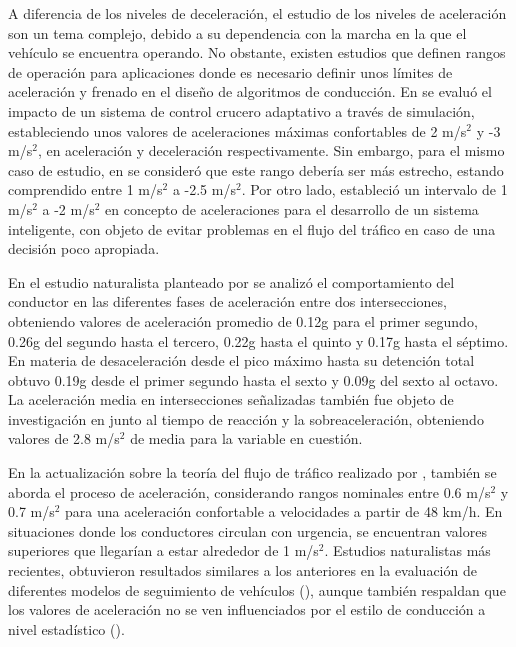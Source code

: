 A diferencia de los niveles de deceleración, el estudio de los niveles de aceleración son un tema complejo, debido a su dependencia con la marcha en la que el vehículo se encuentra operando. No obstante, existen estudios que definen rangos de operación para aplicaciones donde es necesario definir unos límites de aceleración y frenado en el diseño de algoritmos de conducción. En \textcite{vanarem} se evaluó el impacto de un sistema de control crucero adaptativo a través de simulación, estableciendo unos valores de aceleraciones máximas confortables de 2 m/s$^2$ y -3 m/s$^2$, en aceleración y deceleración respectivamente. Sin embargo, para el mismo caso de estudio, en \textcite{yi} se consideró que este rango debería ser más estrecho, estando comprendido entre 1 m/s$^2$ a -2.5 m/s$^2$. Por otro lado, \textcite{prestl} estableció un intervalo de 1 m/s$^2$ a -2 m/s$^2$ en concepto de aceleraciones para el desarrollo de un sistema inteligente, con objeto de evitar problemas en el flujo del tráfico en caso de una decisión poco apropiada. 

En el estudio naturalista planteado por \textcite{danaher} se analizó el comportamiento del conductor en las diferentes fases de aceleración entre dos intersecciones, obteniendo valores de aceleración promedio de 0.12g para el primer segundo, 0.26g del segundo hasta el tercero, 0.22g hasta el quinto y 0.17g hasta el séptimo. En materia de desaceleración desde el pico máximo hasta su detención total obtuvo 0.19g desde el primer segundo hasta el sexto y 0.09g del sexto al octavo. La aceleración media en intersecciones señalizadas también fue objeto de investigación en \textcite{almallah} junto al tiempo de reacción y la sobreaceleración, obteniendo valores de 2.8 m/s$^2$ de media para la variable en cuestión.

En la actualización sobre la teoría del flujo de tráfico realizado por \textcite{gartner}, también se aborda el proceso de aceleración, considerando rangos nominales entre 0.6 m/s$^2$ y 0.7 m/s$^2$ para una aceleración confortable a velocidades a partir de 48 km/h. En situaciones donde los conductores circulan con urgencia, se encuentran valores superiores que llegarían a estar alrededor de 1 m/s$^2$. Estudios naturalistas más recientes, obtuvieron resultados similares a los anteriores en la evaluación de diferentes modelos de seguimiento de vehículos (\cite{he}), aunque también respaldan que los valores de aceleración no se ven influenciados por el estilo de conducción a nivel estadístico (\cite{lyu}).

